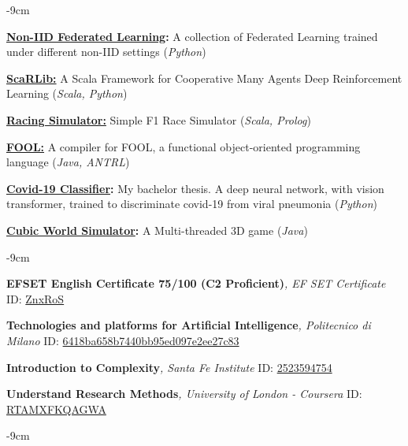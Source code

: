 \documentclass[10pt,a4paper]{altacv}
\begin{document}
\begin{adjustwidth}{}{-9cm}

    \textbf{\href{https://github.com/davidedomini/experiments-2025-lmcs-field-based-FL-baselines}{Non-IID Federated Learning}:} A collection of Federated Learning trained under different non-IID settings (\textit{Python})

    \divider

    \textbf{\href{https://github.com/ScaRLib-group/ScaRLib}{ScaRLib:}} A Scala Framework for Cooperative Many Agents Deep Reinforcement Learning (\textit{Scala, Python}) 
    
    \divider
    
    \textbf{\href{https://davidedomini.github.io/pps-22-sim-race/}{Racing Simulator:}} Simple F1 Race Simulator (\textit{Scala, Prolog})
    
    \divider
    
    \textbf{\href{https://github.com/davidedomini/FOOL-Compiler}{FOOL:}} A compiler for FOOL, a functional object-oriented programming language (\textit{Java, ANTRL})
    
    \divider
    
    \textbf{\href{https://amslaurea.unibo.it/24243/}{Covid-19 Classifier}:} My bachelor thesis. A deep neural network, with vision transformer, trained to discriminate covid-19 from viral pneumonia (\textit{Python}) 
    
    \divider
    
    \textbf{\href{https://github.com/davidedomini/CubicWorldSimulator}{Cubic World Simulator}:} A Multi-threaded 3D game (\textit{Java}) 
\end{adjustwidth}

\begin{adjustwidth}{}{-9cm}

    \textbf{EFSET English Certificate 75/100 (C2 Proficient)}\textit{, EF SET Certificate} ID: \href{https://www.efset.org/cert/ZnxRoS}{ZnxRoS}

    \divider

    \textbf{Technologies and platforms for Artificial Intelligence}\textit{, Politecnico di Milano} \newline ID: \href{https://www.pok.polimi.it/certificates/6418ba658b7440bb95ed097e2ee27c83}{6418ba658b7440bb95ed097e2ee27c83}

    \divider

    \textbf{Introduction to Complexity}\textit{, Santa Fe Institute} ID: \href{https://www.complexityexplorer.org/courses/144-introduction-to-complexity/certificates/2523594754}{2523594754}

    \divider

    \textbf{Understand Research Methods}\textit{, University of London - Coursera} ID: \href{https://www.coursera.org/account/accomplishments/certificate/RTAMXFKQAGWA}{RTAMXFKQAGWA}

\end{adjustwidth}

\begin{adjustwidth}{}{-9cm}
        \renewcommand{\bibsection}{}
        \nocite{*}
        
        

\end{adjustwidth}
\end{document}
